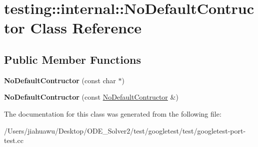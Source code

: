 \hypertarget{classtesting_1_1internal_1_1_no_default_contructor}{}\section{testing\+:\+:internal\+:\+:No\+Default\+Contructor Class Reference}
\label{classtesting_1_1internal_1_1_no_default_contructor}
\subsection*{Public Member Functions}
\begin{DoxyCompactItemize}
\item 
\mbox{\label{classtesting_1_1internal_1_1_no_default_contructor_a34c9cdf833476a9718141dcff931ba42}} 
{\bfseries No\+Default\+Contructor} (const char $\ast$)
\item 
\mbox{\label{classtesting_1_1internal_1_1_no_default_contructor_acba74b55a8c5341808ecb5b9318eaecf}} 
{\bfseries No\+Default\+Contructor} (const \mbox{\hyperlink{classtesting_1_1internal_1_1_no_default_contructor}{No\+Default\+Contructor}} \&)
\end{DoxyCompactItemize}


The documentation for this class was generated from the following file\+:\begin{DoxyCompactItemize}
\item 
/\+Users/jiahuawu/\+Desktop/\+O\+D\+E\+\_\+\+Solver2/test/googletest/test/googletest-\/port-\/test.\+cc\end{DoxyCompactItemize}
